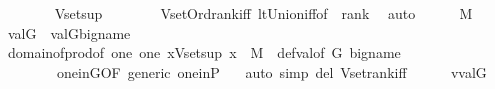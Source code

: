 \begin{isabellebody}
\ \ \ \ \isamarkupfalse%
\ {\isachardoublequoteopen}{\isasymtau}\ {\isasymin}\ Vset{\isacharparenleft}{\kern0pt}{\isacharquery}{\kern0pt}sup{\isacharparenright}{\kern0pt}{\isachardoublequoteclose}\isanewline
\ \ \ \ \ \ \isamarkupfalse%
\ Vset{\isacharunderscore}{\kern0pt}Ord{\isacharunderscore}{\kern0pt}rank{\isacharunderscore}{\kern0pt}iff\ lt{\isacharunderscore}{\kern0pt}Union{\isacharunderscore}{\kern0pt}iff{\isacharbrackleft}{\kern0pt}of\ {\isacharunderscore}{\kern0pt}\ {\isachardoublequoteopen}rank{\isacharparenleft}{\kern0pt}{\isasymtau}{\isacharparenright}{\kern0pt}{\isachardoublequoteclose}{\isacharbrackright}{\kern0pt}\ \isamarkupfalse%
\ auto\isanewline
\ \ \ \ \isamarkupfalse%
\ {\isacartoucheopen}{\isasymtau}{\isasymin}M{\isacartoucheclose}\isanewline
\ \ \ \ \isamarkupfalse%
\ {\isachardoublequoteopen}val{\isacharparenleft}{\kern0pt}G{\isacharcomma}{\kern0pt}{\isasymtau}{\isacharparenright}{\kern0pt}\ {\isasymin}\ val{\isacharparenleft}{\kern0pt}G{\isacharcomma}{\kern0pt}{\isacharquery}{\kern0pt}big{\isacharunderscore}{\kern0pt}name{\isacharparenright}{\kern0pt}{\isachardoublequoteclose}\isanewline
\ \ \ \ \ \ \isamarkupfalse%
\ domain{\isacharunderscore}{\kern0pt}of{\isacharunderscore}{\kern0pt}prod{\isacharbrackleft}{\kern0pt}of\ one\ {\isachardoublequoteopen}{\isacharbraceleft}{\kern0pt}one{\isacharbraceright}{\kern0pt}{\isachardoublequoteclose}\ {\isachardoublequoteopen}{\isacharbraceleft}{\kern0pt}x{\isasymin}Vset{\isacharparenleft}{\kern0pt}{\isacharquery}{\kern0pt}sup{\isacharparenright}{\kern0pt}{\isachardot}{\kern0pt}\ x\ {\isasymin}\ M{\isacharbraceright}{\kern0pt}{\isachardoublequoteclose}\ {\isacharbrackright}{\kern0pt}\ def{\isacharunderscore}{\kern0pt}val{\isacharbrackleft}{\kern0pt}of\ G\ {\isacharquery}{\kern0pt}big{\isacharunderscore}{\kern0pt}name{\isacharbrackright}{\kern0pt}\isanewline
\ \ \ \ \ \ \ \ one{\isacharunderscore}{\kern0pt}in{\isacharunderscore}{\kern0pt}G{\isacharbrackleft}{\kern0pt}OF\ generic{\isacharbrackright}{\kern0pt}\ one{\isacharunderscore}{\kern0pt}in{\isacharunderscore}{\kern0pt}P\ \ \isamarkupfalse%
\ {\isacharparenleft}{\kern0pt}auto\ simp\ del{\isacharcolon}{\kern0pt}\ Vset{\isacharunderscore}{\kern0pt}rank{\isacharunderscore}{\kern0pt}iff{\isacharparenright}{\kern0pt}\isanewline
\ \ \ \ \isamarkupfalse%
\ {\isacartoucheopen}v{\isacharequal}{\kern0pt}val{\isacharparenleft}{\kern0pt}G{\isacharcomma}{\kern0pt}{\isasymtau}{\isacharparenright}{\kern0pt}{\isacartoucheclose}\isanewline

\end{isabellebody}
